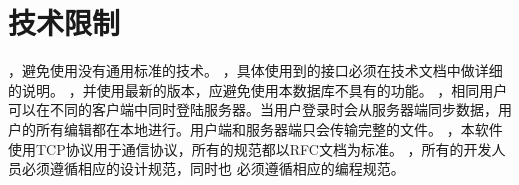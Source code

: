 \section{技术限制}
，避免使用没有通用标准的技术。
，具体使用到的接口必须在技术文档中做详细的说明。
，并使用最新的版本，应避免使用本数据库不具有的功能。
，相同用户可以在不同的客户端中同时登陆服务器。当用户登录时会从服务器端同步数据，用户的所有编辑都在本地进行。用户端和服务器端只会传输完整的文件。
，本软件使用TCP协议用于通信协议，所有的规范都以RFC文档为标准。
，所有的开发人员必须遵循相应的设计规范，同时也 必须遵循相应的编程规范。
